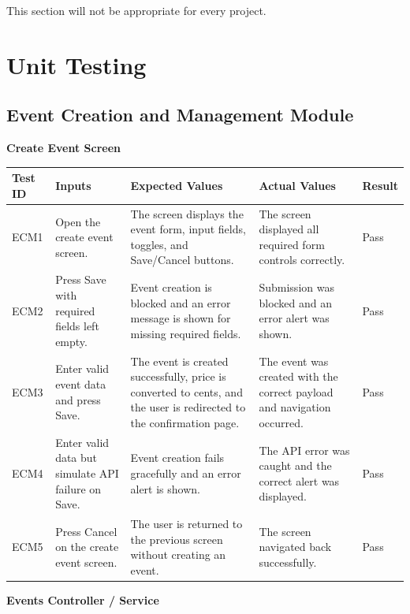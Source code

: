 \documentclass[12pt, titlepage]{article}
\begin{document}
This section will not be appropriate for every project.

\section{Unit Testing}
\label{sec:unit-testing}

\subsection{Event Creation and Management Module}

\textbf{Create Event Screen}

{\small
\setlength{\tabcolsep}{4pt}
\begin{tabularx}{\textwidth}{L{1.6cm}Y Y Y L{1.4cm}}
\toprule
\textbf{Test ID} & \textbf{Inputs} & \textbf{Expected Values} & \textbf{Actual Values} & \textbf{Result} \\
\midrule
ECM1 & Open the create event screen. & The screen displays the event form, input fields, toggles, and Save/Cancel buttons. & The screen displayed all required form controls correctly. & Pass \\
ECM2 & Press Save with required fields left empty. & Event creation is blocked and an error message is shown for missing required fields. & Submission was blocked and an error alert was shown. & Pass \\
ECM3 & Enter valid event data and press Save. & The event is created successfully, price is converted to cents, and the user is redirected to the confirmation page. & The event was created with the correct payload and navigation occurred. & Pass \\
ECM4 & Enter valid data but simulate API failure on Save. & Event creation fails gracefully and an error alert is shown. & The API error was caught and the correct alert was displayed. & Pass \\
ECM5 & Press Cancel on the create event screen. & The user is returned to the previous screen without creating an event. & The screen navigated back successfully. & Pass \\
\bottomrule
\end{tabularx}
}

\vspace{0.5cm}

\textbf{Events Controller / Service}
\end{document}
